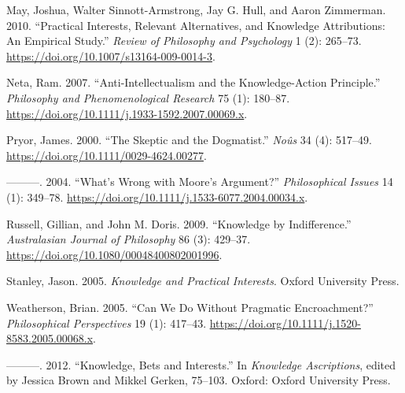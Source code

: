 \documentclass[
  11pt,
  letterpaper,
  DIV=11,
  numbers=noendperiod,
  oneside]{scrartcl}
\newlength{\cslhangindent}
\newenvironment{CSLReferences}[2] %
 {\begin{list}{}{%
  \setlength{\itemindent}{0pt}
  \setlength{\leftmargin}{0pt}
  \setlength{\parsep}{0pt}
  \ifodd #1
   \setlength{\leftmargin}{\cslhangindent}
   \setlength{\itemindent}{-1\cslhangindent}
  \fi
  \setlength{\itemsep}{#2\baselineskip}}}
 {\end{list}}
\begin{document}
\begin{CSLReferences}{1}{0}
May, Joshua, Walter Sinnott-Armstrong, Jay G. Hull, and Aaron Zimmerman.
2010. {``Practical Interests, Relevant Alternatives, and Knowledge
Attributions: An Empirical Study.''} \emph{Review of Philosophy and
Psychology} 1 (2): 265--73.
\url{https://doi.org/10.1007/s13164-009-0014-3}.

Neta, Ram. 2007. {``Anti-Intellectualism and the Knowledge-Action
Principle.''} \emph{Philosophy and Phenomenological Research} 75 (1):
180--87. \url{https://doi.org/10.1111/j.1933-1592.2007.00069.x}.

Pryor, James. 2000. {``{The Skeptic and the Dogmatist}.''} \emph{No{û}s}
34 (4): 517--49. \url{https://doi.org/10.1111/0029-4624.00277}.

---------. 2004. {``{What's Wrong with Moore's Argument?}''}
\emph{Philosophical Issues} 14 (1): 349--78.
\url{https://doi.org/10.1111/j.1533-6077.2004.00034.x}.

Russell, Gillian, and John M. Doris. 2009. {``Knowledge by
Indifference.''} \emph{Australasian Journal of Philosophy} 86 (3):
429--37. \url{https://doi.org/10.1080/00048400802001996}.

Stanley, Jason. 2005. \emph{{Knowledge and Practical Interests}}. Oxford
University Press.

Weatherson, Brian. 2005. {``{Can We Do Without Pragmatic
Encroachment?}''} \emph{Philosophical Perspectives} 19 (1): 417--43.
\url{https://doi.org/10.1111/j.1520-8583.2005.00068.x}.

---------. 2012. {``Knowledge, Bets and Interests.''} In \emph{Knowledge
Ascriptions}, edited by Jessica Brown and Mikkel Gerken, 75--103.
Oxford: Oxford University Press.

\end{CSLReferences}
\end{document}
